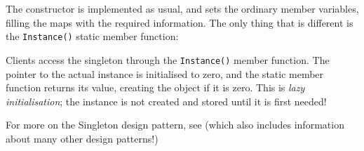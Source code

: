 \documentclass[a4paper]{scrartcl}
\begin{document}
The constructor is implemented as usual, and sets the ordinary member variables, filling the maps with the required information. The only thing that is different is the \verb|Instance()| static member function:



Clients access the singleton through the \verb|Instance()| member function. The pointer to the actual instance is initialised to zero, and the static member function returns its value, creating the object if it is zero. This is \emph{lazy initialisation}; the instance is not created and stored until it is first needed!

For more on the Singleton design pattern, see\cite{DesignPatterns} (which also includes information about many other design patterns!)


\end{document}
